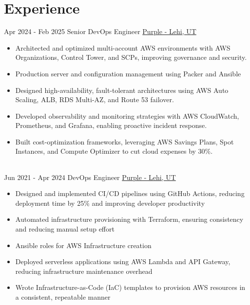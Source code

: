 \documentclass[letterpaper]{tenseconds} %
\begin{document}
\section{Experience}
\begin{twenty} %
	\twentyitem
	{Apr 2024 - }
	{Feb 2025}
	{Senior DevOps Engineer}
	{\href{https://purple.com/}{Purple - Lehi, UT}}
	{}
	{\begin{itemize}
		\item Architected and optimized multi-account AWS environments with AWS Organizations, Control Tower, and SCPs, improving governance and security.
		\item Production server and configuration management using Packer and Ansible
		\item Designed high-availability, fault-tolerant architectures using AWS Auto Scaling, ALB, RDS Multi-AZ, and Route 53 failover.
		\item Developed observability and monitoring strategies with AWS CloudWatch, Prometheus, and Grafana, enabling proactive incident response.
		\item Built cost-optimization frameworks, leveraging AWS Savings Plans, Spot Instances, and Compute Optimizer to cut cloud expenses by 30\%.
		\end{itemize}}
	\\
	\twentyitem
	{Jun 2021 -}
	{Apr 2024}
	{DevOps Engineer}
	{\href{https://purple.com/}{Purple - Lehi, UT}}
	{}
	{\begin{itemize}
    \item Designed and implemented CI/CD pipelines using GitHub Actions, reducing deployment time by 25\% and improving developer productivity
    \item Automated infrastructure provisioning with Terraform, ensuring consistency and reducing manual setup effort
		\item Ansible roles for AWS Infrastructure creation
		\item Deployed serverless applications using AWS Lambda and API Gateway, reducing infrastructure maintenance overhead
    \item Wrote Infrastructure-as-Code (IaC) templates to provision AWS resources in a consistent, repeatable manner
		\end{itemize}}
   \\

\end{twenty}
\end{document}
